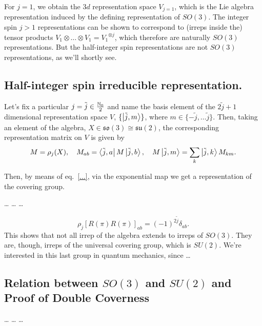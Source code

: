 For $j=1$, we obtain the $3d$ representation space $V_{j=1}$, which is the Lie algebra representation induced by the defining representation of $SO(3)$. The integer spin $j>1$ representations can be shown to correspond to (irreps inside the) tensor
products $V_1 \otimes \dots \otimes V_1 = {V_1}^{\otimes j}$, which therefore are naturally $SO(3)$ representations. But the half-integer spin representations are not $SO(3)$ representations, as we'll shortly see.


\subsection{Half-integer spin irreducible representation.}
Let's fix a particular $j = \tilde{j} \in \frac{\mathbb{N}_0}{2}$ and name the basis element of the $2 \tilde{j} + 1$ dimensional representation space $V$, $\{ \ket{\tilde{j}, m} \}$, where $m \in \{ -\tilde{j}, \dots \tilde{j} \}$. Then, taking an element of the algebra, $X \in \mathfrak{so}(3) \cong \mathfrak{su}(2)$, the corresponding representation matrix on $V$ is given by
\begin{equation}
    M = \rho_j (X), \quad M_{ab} = \bra{\tilde{j},a} M \ket{\tilde{j},b}, \quad M \ket{\tilde{j}, m} = \sum_k \ket{\tilde{j}, k} M_{km} .
\end{equation}

Then, by means of eq.~\eqref{...}, via the exponential map we get a representation of the covering group.

\color{red}
\dots
\dots
\dots

\begin{equation}
    \rho_j[R(\pi)R(\pi)]_{ab} = (-1)^{2\tilde{j}} \delta_{ab}.
\end{equation}
This shows that not all irrep of the algebra extends to irreps of $SO(3)$. They are, though, irreps of the universal covering group, which is $SU(2)$. We're interested in this last group in quantum mechanics, since \dots
\color{black}

\subsection{Relation between \texorpdfstring{$SO(3)$}{SO(3)} and \texorpdfstring{$SU(2)$}{SU(2)} and Proof of Double Coverness}
\dots
\dots
\dots